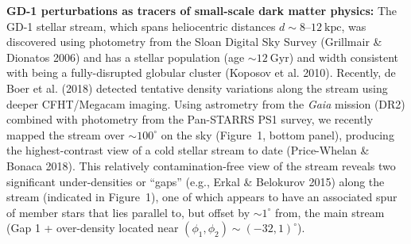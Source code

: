 \documentclass[11pt]{article}
\begin{document}
\textbf{GD-1 perturbations as tracers of small-scale dark matter physics:}
The GD-1 stellar stream, which spans heliocentric distances $d\sim 8$--$12~\textrm{kpc}$, was discovered using photometry from the Sloan Digital Sky Survey (Grillmair \& Dionatos 2006) and has a stellar population (age $\sim 12~\textrm{Gyr}$) and width consistent with being a fully-disrupted globular cluster (Koposov et al. 2010).
Recently, de Boer et al. (2018) detected tentative density variations along the stream using deeper CFHT/Megacam imaging.
Using astrometry from the \textit{Gaia} mission (DR2) combined with photometry from the Pan-STARRS PS1 survey, we recently mapped the stream over $\sim 100^\circ$ on the sky (Figure~1, bottom panel), producing the highest-contrast view of a cold stellar stream to date (Price-Whelan \& Bonaca 2018).
This relatively contamination-free view of the stream reveals two significant under-densities or ``gaps'' (e.g., Erkal \& Belokurov 2015) along the stream (indicated in Figure~1), one of which appears to have an associated spur of member stars that lies parallel to, but offset by $\sim1^\circ$ from, the main stream (Gap 1 + over-density located near $(\phi_1, \phi_2) \sim (-32, 1)^\circ$).
\end{document}
